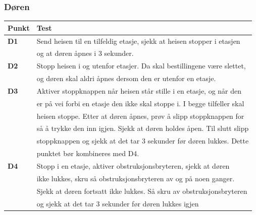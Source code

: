 \documentclass{article}
\begin{document}
\subsubsection{Døren}
\begin{table}[htbp]
\begin{tabularx}{\textwidth}{ l l }  %
\toprule
Punkt & Test \\
        \midrule
        \textbf{D1} & Send heisen til en tilfeldig etasje, sjekk at heisen stopper i etasjen\\
        & og at døren åpnes i 3 sekunder. \\
        \midrule
        \textbf{D2} & Stopp heisen i og utenfor etasjer. Da skal bestillingene være slettet, \\
        & og døren skal aldri åpnes dersom den er utenfor en etasje. \\
        \midrule
        \textbf{D3} & Aktiver stoppknappen når heisen står stille i en etasje, og når den\\
        & er på vei forbi en etasje den ikke skal stoppe i. I begge tilfeller skal \\
        & heisen stoppe. Etter at døren åpnes, prøv å slipp stoppknappen for \\
        & så å trykke den inn igjen. Sjekk at døren holdes åpen. Til slutt slipp \\
        & stoppknappen og sjekk at det tar 3 sekunder før døren lukkes. Dette \\
        & punktet bør kombineres med D4.\\
        \midrule
        \textbf{D4} & Stopp i en etasje, aktiver obstruksjonsbryteren, sjekk at døren \\
        & ikke lukkes, skru så obstruksjonsbryteren av og på noen ganger. \\
        &  Sjekk at døren fortsatt ikke lukkes. Så skru av obstruksjonsbryteren \\
        & og sjekk at det tar 3 sekunder før døren lukkes igjen \\
\bottomrule
\end{tabularx}
\label{table:nonlin}
\end{table}
\newpage
\end{document}

